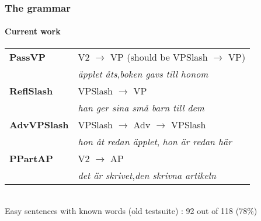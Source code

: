 \documentclass[10pt]{beamer}
\begin{document}
\begin{frame}
\frametitle{The grammar}
\framesubtitle{Current work} 
\begin{tabular}{ll}
\textbf{PassVP} & V2 $\rightarrow$ VP (should be VPSlash $\rightarrow$ VP) \\
& \emph{äpplet åts},\emph{boken gavs till honom} \\ %

\textbf{ReflSlash} & VPSlash $\rightarrow$ VP \\
& \emph{han ger sina små barn till dem} \\
%

\textbf{AdvVPSlash} & VPSlash $\rightarrow$ Adv $\rightarrow$ VPSlash \\
& \emph{hon åt redan äpplet}, \emph{hon är redan här}\\

\textbf{PPartAP} & V2 $\rightarrow$ AP \\
& \emph{det är skrivet},\emph{den skrivna artikeln}
\end{tabular}\\
  
Easy sentences with known words (old testsuite) : 92 out of 118 (78\%) \\
\end{frame}
\end{document}
